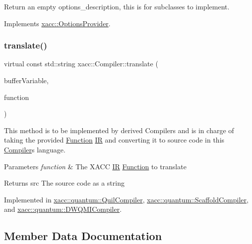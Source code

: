 Return an empty options\+\_\+description, this is for subclasses to implement. 

Implements \hyperlink{a01219_a6d150954f852109bfe2c1ae90222926f}{xacc\+::\+Options\+Provider}.

\mbox{\label{a01127_aeedbe58a33fed29e4d7694ae743e25e7}} 
\subsubsection{\texorpdfstring{translate()}{translate()}}
{\footnotesize\ttfamily virtual const std\+::string xacc\+::\+Compiler\+::translate (\begin{DoxyParamCaption}\item[{const std\+::string \&}]{buffer\+Variable,  }\item[{std\+::shared\+\_\+ptr$<$ \hyperlink{a01151}{Function} $>$}]{function }\end{DoxyParamCaption})\hspace{0.3cm}{\ttfamily [pure virtual]}}

This method is to be implemented by derived Compilers and is in charge of taking the provided \hyperlink{a01151}{Function} \hyperlink{a01175}{IR} and converting it to source code in this \hyperlink{a01127}{Compiler}\textquotesingle{}s language.


\begin{DoxyParams}{Parameters}
{\em function} & The X\+A\+CC \hyperlink{a01175}{IR} \hyperlink{a01151}{Function} to translate \\
\hline
\end{DoxyParams}
\begin{DoxyReturn}{Returns}
src The source code as a string 
\end{DoxyReturn}


Implemented in \hyperlink{a00931_a66ca00bbb1f30e7bc6dd86b1e267b93b}{xacc\+::quantum\+::\+Quil\+Compiler}, \hyperlink{a00951_ac7ca2941e987ba579c6f50cfbd7fb0dc}{xacc\+::quantum\+::\+Scaffold\+Compiler}, and \hyperlink{a00923_a56a345539665099329209b3b5f6810c9}{xacc\+::quantum\+::\+D\+W\+Q\+M\+I\+Compiler}.



\subsection{Member Data Documentation}
\mbox{\label{a01127_ad4cbb467fa7e377bac6c054ffcb22b7c}} 
